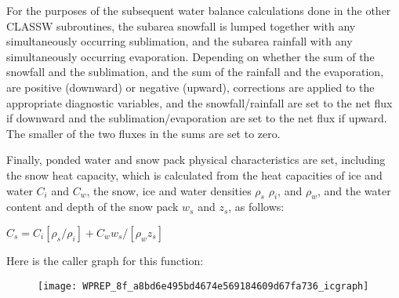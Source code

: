 For the purposes of the subsequent water balance calculations done in the other C\+L\+A\+S\+S\+W subroutines, the subarea snowfall is lumped together with any simultaneously occurring sublimation, and the subarea rainfall with any simultaneously occurring evaporation. Depending on whether the sum of the snowfall and the sublimation, and the sum of the rainfall and the evaporation, are positive (downward) or negative (upward), corrections are applied to the appropriate diagnostic variables, and the snowfall/rainfall are set to the net flux if downward and the sublimation/evaporation are set to the net flux if upward. The smaller of the two fluxes in the sums are set to zero.

Finally, ponded water and snow pack physical characteristics are set, including the snow heat capacity, which is calculated from the heat capacities of ice and water $C_i$ and $C_w$, the snow, ice and water densities $\rho_s$ $\rho_i$, and $\rho_w$, and the water content and depth of the snow pack $w_s$ and $z_s$, as follows\+:

$C_s = C_i [\rho_s /\rho_i] + C_w w_s /[\rho_w z_s]$

Here is the caller graph for this function\+:\nopagebreak
\begin{figure}[H]
\begin{center}
\leavevmode
\texttt{[image: WPREP\_8f\_a8bd6e495bd4674e569184609d67fa736\_icgraph]}
\end{center}
\end{figure}


